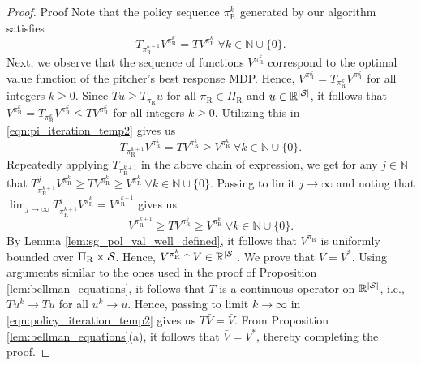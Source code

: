 \documentclass[aoas]{imsart}
\theoremstyle{plain}
\theoremstyle{definition}
\newcommand{\abs}[1]{\left\lvert#1\right\rvert}
\begin{document}
\begin{proof}{Proof}
           Note that the policy sequence $\pi_\text{R}^k$ generated by our algorithm satisfies  
           \begingroup
           \allowdisplaybreaks
           \begin{equation}
           \label{eqn:pi_iteration_temp2}
           T_{\pi_\text{R}^{k+1}}V^{\pi_\text{R}^k} = TV^{\pi_\text{R}^k} \ \forall k \in \mathbb{N} \cup \{0\}.
           \end{equation}
           \endgroup
           Next, we observe that the sequence of functions $V^{\pi_\text{R}^k}$ correspond to the optimal value function of the pitcher's best response MDP. Hence, $V^{\pi_\text{R}^k} = T_{\pi_\text{R}^k} V^{\pi_\text{R}^k}$ for all integers $k \geq 0$. Since $Tu \geq T_{\pi_\text{R}}u$ for all $\pi_\text{R} \in \Pi_\text{R}$ and $u \in \mathbb{R}^{\abs{\cal S}}$, it follows that $V^{\pi_\text{R}^k} = T_{\pi_\text{R}^k} V^{\pi_\text{R}^k} \leq T V^{\pi_\text{R}^k}$ for all integers $k \geq 0$. Utilizing this in \eqref{eqn:pi_iteration_temp2} gives us
           \[
               T_{\pi_\text{R}^{k+1}}V^{\pi_\text{R}^k} = TV^{\pi_\text{R}^k} \geq V^{\pi_\text{R}^k} \ \forall k \in \mathbb{N} \cup \{0\}.
           \]
          Repeatedly applying $T_{\pi_\text{R}^{k+1}}$ in the above chain of expression, we get for any $j \in \mathbb{N}$ that $T_{\pi_\text{R}^{k+1}}^j V^{\pi_\text{R}^k} \geq TV^{\pi_\text{R}^k} \geq V^{\pi_\text{R}^k} \ \forall k \in \mathbb{N} \cup \{0\}$. Passing to limit $j \to \infty$ and noting that $\lim_{j \to \infty}T_{\pi_\text{R}^{k+1}}^j V^{\pi_\text{R}^k} = V^{\pi_\text{R}^{k+1}}$ gives us
           \begingroup
           \allowdisplaybreaks
           \begin{equation}
           \label{eqn:policy_iteration_temp2}
               V^{\pi_\text{R}^{k+1}} \geq TV^{\pi_\text{R}^k} \geq V^{\pi_\text{R}^k} \ \forall k \in \mathbb{N} \cup \{0\}.
           \end{equation}
           \endgroup
           By Lemma  \ref{lem:sg_pol_val_well_defined}, it follows that $V^{\pi_\text{R}}$ is uniformly bounded over $\Pi_\text{R} \times {\cal S}$. Hence, $V^{\pi_\text{R}^k} \uparrow \bar V \in \mathbb{R}^{\abs{\cal S}}$. We prove that $\bar V = V^*$. Using arguments similar to the ones used in the proof of Proposition  \ref{lem:bellman_equations}, it follows that $T$ is a  continuous operator on $\mathbb{R}^{\abs{\cal S}}$, i.e., $T u^k \to T u$ for all $u^k \to u$. Hence, passing to limit $k \to \infty$ in \eqref{eqn:policy_iteration_temp2} gives us $T \bar V = \bar V$. From Proposition  \ref{lem:bellman_equations}(a), it follows that $\bar V = V^*$, thereby completing the proof.
       \end{proof}
    
\end{document}
